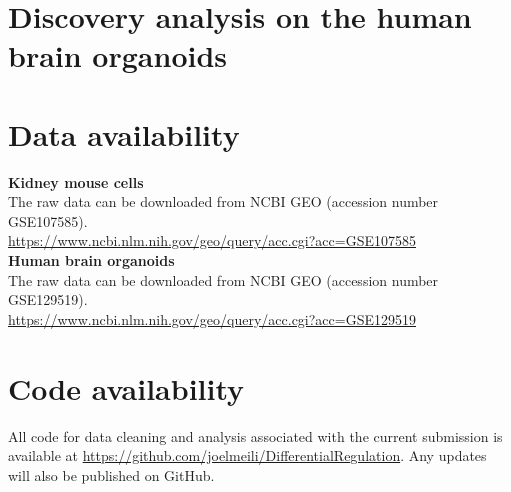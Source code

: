 \section{Discovery analysis on the human brain organoids}

\section{Data availability}

\noindent\textbf{Kidney mouse cells} \\
The raw data can be downloaded from NCBI GEO (accession number GSE107585). \\ 
\url{https://www.ncbi.nlm.nih.gov/geo/query/acc.cgi?acc=GSE107585} \\

\noindent\textbf{Human brain organoids} \\
The raw data can be downloaded from NCBI GEO (accession number GSE129519). \\
\url{https://www.ncbi.nlm.nih.gov/geo/query/acc.cgi?acc=GSE129519}

\section{Code availability}
All code for data cleaning and analysis associated with the current submission is available at \url{https://github.com/joelmeili/DifferentialRegulation}. Any updates will also be published on GitHub.

